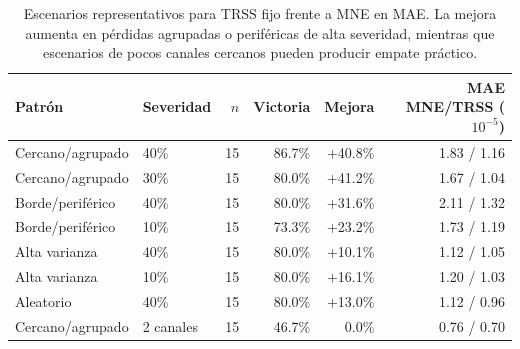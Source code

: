 \begin{table}[htbp]
\centering
\footnotesize
\caption{Escenarios representativos para TRSS fijo frente a MNE en MAE. La mejora aumenta en pérdidas agrupadas o periféricas de alta severidad, mientras que escenarios de pocos canales cercanos pueden producir empate práctico.}
\label{tab:ch6_selected_scenarios_mae}
\begin{tabular}{@{}llrrrr@{}}
\toprule
Patrón & Severidad & $n$ & Victoria & Mejora & MAE MNE/TRSS ($10^{-5}$) \\
\midrule
Cercano/agrupado & 40\% & 15 & 86.7\% & +40.8\% & 1.83 / 1.16 \\
Cercano/agrupado & 30\% & 15 & 80.0\% & +41.2\% & 1.67 / 1.04 \\
Borde/periférico & 40\% & 15 & 80.0\% & +31.6\% & 2.11 / 1.32 \\
Borde/periférico & 10\% & 15 & 73.3\% & +23.2\% & 1.73 / 1.19 \\
Alta varianza & 40\% & 15 & 80.0\% & +10.1\% & 1.12 / 1.05 \\
Alta varianza & 10\% & 15 & 80.0\% & +16.1\% & 1.20 / 1.03 \\
Aleatorio & 40\% & 15 & 80.0\% & +13.0\% & 1.12 / 0.96 \\
Cercano/agrupado & 2 canales & 15 & 46.7\% & 0.0\% & 0.76 / 0.70 \\
\bottomrule
\end{tabular}
\end{table}
